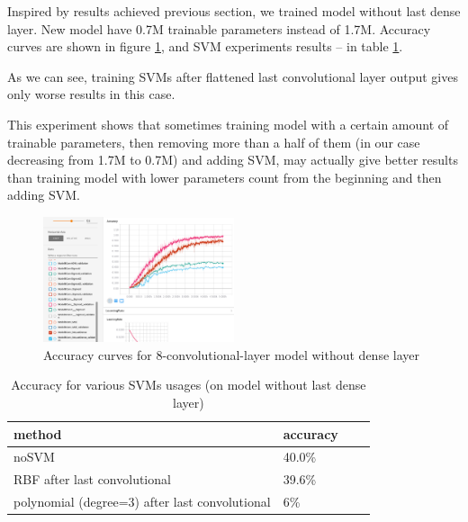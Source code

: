 \documentclass[a4paper]{article}
\begin{document}
Inspired by results achieved previous section,
we trained model without last dense layer.
New model have 0.7M trainable parameters instead of 1.7M.
Accuracy curves are shown in figure \ref{fig:noDense},
and SVM experiments results -- in table \ref{table:svm2}.

As we can see, training SVMs after flattened last convolutional
layer output gives only worse results in this case.

This experiment shows that sometimes training model with a certain
amount of trainable parameters, then removing more than a half
of them (in our case decreasing from 1.7M to 0.7M) and adding SVM,
may actually give better results than training model with lower
parameters count from the beginning and then adding SVM.

\begin{figure}[!hbt]
    \centering
    \includegraphics[page=2,width=0.5\textwidth]{noDense.png}
    \caption[]{Accuracy curves for 8-convolutional-layer model without dense layer
    \label{fig:noDense}
    }
\end{figure}

\begin{table}[!hbt]
    \caption{Accuracy for various SVMs usages (on model without last dense layer)
    \label{table:svm2}
    }
\begin{center}
    \begin{tabular}{| l | l | l | l |}
    \hline
    method&accuracy \\
    \hline
        noSVM & 40.0\% \\
        RBF after last convolutional & 39.6\% \\
        polynomial (degree=3) after last convolutional & 6\% \\
    \hline
    \end{tabular}
\end{center}
\end{table}
\end{document}
